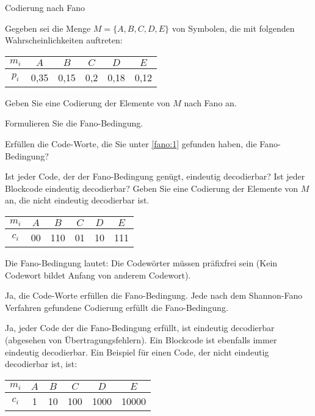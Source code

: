 \documentclass{exercisesheet}
\begin{document}
\begin{eexercises}{Codierung nach Fano}{
    Gegeben sei die Menge $M = \{A, B, C, D, E\}$ von Symbolen, die mit folgenden Wahrscheinlichkeiten auftreten:
    \centering\begin{tabular}{c|ccccc}
      $m_i$ & $A$  & $B$  & $C$ & $D$  & $E$  \\
      \hline
      $p_i$ & 0,35 & 0,15 & 0,2 & 0,18 & 0,12 \\
    \end{tabular}
  }
  \item\label{fano:1} Geben Sie eine Codierung der Elemente von $M$ nach Fano an.
  \item Formulieren Sie die Fano-Bedingung.
  \item Erfüllen die Code-Worte, die Sie unter \ref{fano:1} gefunden haben, die Fano-Bedingung?
  \item Ist jeder Code, der der Fano-Bedingung genügt, eindeutig decodierbar? Ist jeder Blockcode eindeutig decodierbar? Geben Sie eine Codierung der Elemente von $M$ an, die nicht eindeutig decodierbar ist.
\end{eexercises}

\begin{solutions}
  \item
  \begin{tabular}{c|ccccc}
    $m_i$ & $A$ & $B$ & $C$ & $D$ & $E$ \\
    \hline
    $c_i$ & 00  & 110 & 01  & 10  & 111 \\
  \end{tabular}
  \item Die Fano-Bedingung lautet: Die Codewörter müssen präfixfrei sein (Kein Codewort bildet Anfang von anderem Codewort).
  \item Ja, die Code-Worte erfüllen die Fano-Bedingung. Jede nach dem Shannon-Fano Verfahren gefundene Codierung erfüllt die Fano-Bedingung.
  \item Ja, jeder Code der die Fano-Bedingung erfüllt, ist eindeutig decodierbar (abgesehen von Übertragungsfehlern). Ein Blockcode ist ebenfalls immer eindeutig decodierbar. Ein Beispiel für einen Code, der nicht eindeutig decodierbar ist, ist:\par
  \begin{tabular}{c|ccccc}
    $m_i$ & $A$ & $B$ & $C$ & $D$  & $E$   \\
    \hline
    $c_i$ & 1   & 10  & 100 & 1000 & 10000 \\
  \end{tabular}
\end{solutions}
\end{document}

